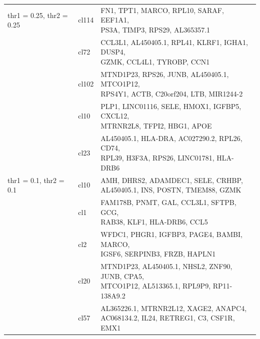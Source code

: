 \begin{table}[ht!]
\begin{tabular}{l|l|l}
\midrule
thr1 = 0.25, thr2 = 0.25 & cl114 & \specialcell[t]{FN1, TPT1, MARCO, RPL10, SARAF, EEF1A1,\\PS3A, TIMP3, RPS29, AL365357.1}  \\
 & cl72 & \specialcell[t]{CCL3L1, AL450405.1, RPL41, KLRF1, IGHA1, DUSP4,\\GZMK, CCL4L1, TYROBP, CCN1}  \\
 & cl102 & \specialcell[t]{MTND1P23, RPS26, JUNB, AL450405.1, MTCO1P12,\\RPS4Y1, ACTB, C20orf204, LTB, MIR1244-2}  \\
 & cl10 & \specialcell[t]{PLP1, LINC01116, SELE, HMOX1, IGFBP5, CXCL12,\\MTRNR2L8, TFPI2, HBG1, APOE}  \\
 & cl23 & \specialcell[t]{ AL450405.1, HLA-DRA, AC027290.2, RPL26, CD74,\\RPL39, H3F3A, RPS26, LINC01781, HLA-DRB6}  \\

\midrule
thr1 = 0.1, thr2 = 0.1 & cl10 & \specialcell[t]{AMH, DHRS2, ADAMDEC1, SELE, CRHBP,\\AL450405.1, INS, POSTN, TMEM88, GZMK}  \\
 & cl1 & \specialcell[t]{FAM178B, PNMT, GAL, CCL3L1, SFTPB, GCG,\\RAB38, KLF1, HLA-DRB6, CCL5}  \\
 & cl2 & \specialcell[t]{WFDC1, PHGR1, IGFBP3, PAGE4, BAMBI, MARCO,\\IGSF6, SERPINB3, FRZB, HAPLN1}  \\
 & cl20 & \specialcell[t]{MTND1P23, AL450405.1, NHSL2, ZNF90, JUNB, CPA5,\\MTCO1P12, AL513365.1, RPL9P9, RP11-138A9.2}  \\
 & cl57 & \specialcell[t]{AL365226.1, MTRNR2L12, XAGE2, ANAPC4,\\AC068134.2, IL24, RETREG1, C3, CSF1R, EMX1}  \\

\bottomrule
\end{tabular}
\end{table}
